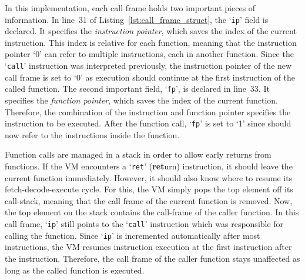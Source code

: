 In this implementation, each call frame holds two important pieces of information.
In line~31 of Listing~\ref{lst:call_frame_struct}, the `\texttt{ip}' field is declared.
It specifies the \emph{instruction pointer}, which saves the index of the current instruction.
This index is relative for each function, meaning that the instruction pointer `0' can refer to multiple instructions,
each in another function.
Since the `\texttt{call}' instruction was interpreted previously, the instruction pointer of the new call frame is set to `0' as execution should continue at the first instruction of the called function.
The second important field, `\texttt{fp}', is declared in line~33.
It specifies the \emph{function pointer}, which saves the index of the current function.
Therefore, the combination of the instruction and function pointer specifies the instruction to be executed.
After the function call, `\texttt{fp}' is set to `1' since  should now refer to the instructions inside the  function.

Function calls are managed in a stack in order to allow early returns from functions.
If the VM encounters a `\texttt{ret}' (\textbf{ret}urn) instruction, it should leave the current function immediately.
However, it should also know where to resume its fetch-decode-execute cycle.
For this, the VM simply pops the top element off its call-stack, meaning that the call frame of the current function is removed.
Now, the top element on the stack contains the call-frame of the caller function.
In this call frame, `\texttt{ip}' still points to the `\texttt{call}' instruction which was responsible for calling the function.
Since `\texttt{ip}' is incremented automatically after most instructions, the VM resumes instruction execution at the first instruction after the  instruction.
Therefore, the call frame of the caller function stays unaffected as long as the called function is executed.


